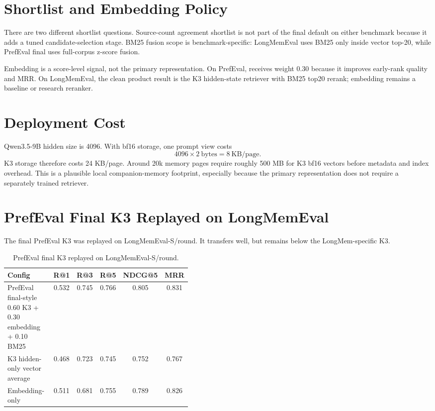 \documentclass[11pt]{article}
\begin{document}
\section{Shortlist and Embedding Policy}

There are two different shortlist questions. Source-count agreement shortlist
is not part of the final default on either benchmark because it adds a tuned
candidate-selection stage. BM25 fusion scope is benchmark-specific: LongMemEval
uses BM25 only inside vector top-20, while PrefEval final uses full-corpus
z-score fusion.

Embedding is a score-level signal, not the primary representation. On PrefEval,
 receives weight 0.30 because it improves
early-rank quality and MRR. On LongMemEval, the clean product result is the K3
hidden-state retriever with BM25 top20 rerank; embedding remains a baseline or
research reranker.

\section{Deployment Cost}

Qwen3.5-9B hidden size is 4096. With bf16 storage, one prompt view costs
\[
4096 \times 2\ \mathrm{bytes} = 8\ \mathrm{KB/page}.
\]
K3 storage therefore costs 24 KB/page. Around 20k memory pages require roughly
500 MB for K3 bf16 vectors before metadata and index overhead. This is a
plausible local companion-memory footprint, especially because the primary
representation does not require a separately trained retriever.

\section{PrefEval Final K3 Replayed on LongMemEval}

The final PrefEval K3 was replayed on LongMemEval-S/round. It transfers well,
but remains below the LongMem-specific K3.

\begin{table}[h]
\centering
\caption{PrefEval final K3 replayed on LongMemEval-S/round.}
\small
\begin{tabular}{p{0.43\linewidth}ccccc}
\toprule
Config & R@1 & R@3 & R@5 & NDCG@5 & MRR \\
\midrule
PrefEval final-style 0.60 K3 + 0.30 embedding + 0.10 BM25 & 0.532 & 0.745 & 0.766 & 0.805 & 0.831 \\
K3 hidden-only vector average & 0.468 & 0.723 & 0.745 & 0.752 & 0.767 \\
Embedding-only & 0.511 & 0.681 & 0.755 & 0.789 & 0.826 \\
\bottomrule
\end{tabular}
\end{table}
\end{document}
